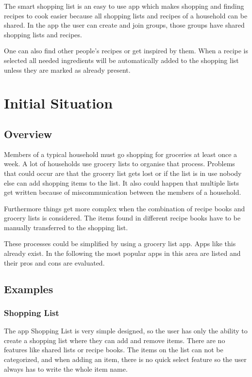 \documentclass[12pt]{article}
\theoremstyle{definition}
\begin{document}
The smart shopping list is an easy to use app which makes shopping and finding recipes to cook easier because all shopping lists and recipes of a household can be shared. In the app the user can create and join groups, those groups have shared shopping lists and recipes.

One can also find other people's recipes or get inspired by them. When a recipe is selected all needed ingredients will be automatically added to the shopping list unless they are marked as already present. 

\pagebreak

\section{Initial Situation}

\subsection{Overview}

Members of a typical household must go shopping for groceries at least once a week. A lot of households use grocery lists to organise that process. Problems that could occur are that the grocery list gets lost or if the list is in use nobody else can add shopping items to the list. It also could happen that multiple lists get written because of miscommunication between the members of a household.

Furthermore things get more complex when the combination of recipe books and grocery lists is considered. The items found in different recipe books have to be manually transferred to the shopping list. 

These processes could be simplified by using a grocery list app. Apps like this already exist. In the following the most popular apps in this area are listed and their pros and cons are evaluated.

\subsection{Examples}
\subsubsection{Shopping List}
The app Shopping List is very simple designed, so the user has only the ability to create a shopping list where they can add and remove items. There are no features like shared lists or recipe books. The items on the list can not be categorized, and when adding an item, there is no quick select feature so the user always has to write the whole item name.
\end{document}
